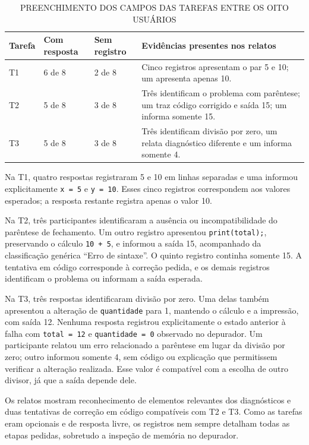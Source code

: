 \documentclass[
    12pt
    ,oneside
    ,a4paper
    ,chapter=TITLE
    ,section=TITLE
    ,sumario=abnt-6027-2012]{abntex2}
\renewcommand{\legenda}[2][]{%
    \centering
    \caption[\MakeTextUppercase{#2}]{\maybeLabel{#1}\MakeTextUppercase{#2}}%
}
\begin{document}
\begin{table}[htb]
\centering
\legenda[tab:respostas_tarefas]{Preenchimento dos campos das tarefas entre os oito usuários}
\small
\begin{tabular}{P{1.2cm}P{2.4cm}P{2.4cm}P{7.0cm}}
\toprule
Tarefa & Com resposta & Sem registro & Evidências presentes nos relatos \\
\midrule
T1 & 6 de 8 & 2 de 8 & Cinco registros apresentam o par 5 e 10; um apresenta apenas 10. \\
T2 & 5 de 8 & 3 de 8 & Três identificam o problema com parêntese; um traz código corrigido e saída 15; um informa somente 15. \\
T3 & 5 de 8 & 3 de 8 & Três identificam divisão por zero, um relata diagnóstico diferente e um informa somente 4. \\
\bottomrule
\end{tabular}
\vspace{0.2cm}
\end{table}
\FloatBarrier

Na T1, quatro respostas registraram 5 e 10 em linhas separadas e uma informou explicitamente
\texttt{x = 5} e \texttt{y = 10}. Esses cinco registros correspondem aos valores esperados; a resposta restante registra apenas o valor 10.

Na T2, três participantes identificaram a ausência ou incompatibilidade do parêntese de
fechamento. Um outro registro apresentou \texttt{print(total);}, preservando o cálculo
\texttt{10 + 5}, e informou a saída 15, acompanhado da classificação genérica ``Erro de
sintaxe''. O quinto registro continha somente 15. A tentativa em código corresponde à correção pedida, e os demais registros identificam o problema ou informam a saída esperada.

Na T3, três respostas identificaram divisão por zero. Uma delas também apresentou a
alteração de \texttt{quantidade} para 1, mantendo o cálculo e a impressão, com saída 12.
Nenhuma resposta registrou explicitamente o estado anterior à falha com
\texttt{total = 12} e \texttt{quantidade = 0} observado no depurador. Um participante
relatou um erro relacionado a parêntese em lugar da divisão por zero; outro informou
somente 4, sem código ou explicação que permitissem verificar a alteração realizada.
Esse valor é compatível com a escolha de outro divisor, já que a saída depende dele.

Os relatos mostram reconhecimento de elementos relevantes dos diagnósticos e duas
tentativas de correção em código compatíveis com T2 e T3. Como as tarefas eram opcionais e de resposta livre, os registros nem sempre detalham todas as etapas pedidas, sobretudo a inspeção de memória no depurador.
\end{document}
